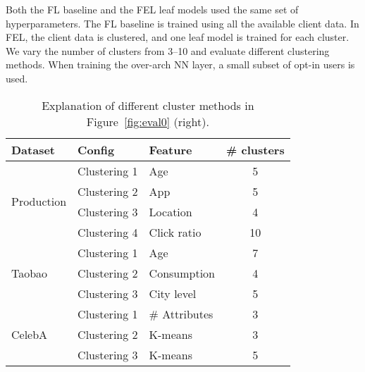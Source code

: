 Both the FL baseline and the FEL leaf models used the same set of hyperparameters. 
The FL baseline is trained using all the available client data. In FEL, the client data is clustered, and one leaf model is trained for each cluster. We vary the number of clusters from 3--10 and evaluate different clustering methods.
When training the over-arch NN layer, a small subset of opt-in users is used.


\begin{table}
\small
\centering
\caption{\label{tab:clusterconfig} Explanation of different cluster methods in Figure~\ref{fig:eval0} (right).}
\begin{tabular}{|l||l|l|c|}
\hline
Dataset & Config & Feature & \# clusters \\ \hline\hline
\multirow{4}{*}{Production} & Clustering 1 & Age & 5\\
 & Clustering 2 & App & 5\\
 & Clustering 3 & Location & 4\\
 & Clustering 4 & Click ratio & 10\\\hline
\multirow{3}{*}{Taobao~\cite{taobao}} & Clustering 1 & Age & 7\\
 & Clustering 2 & Consumption & 4\\
 & Clustering 3 & City level & 5\\\hline
\multirow{3}{*}{CelebA~\cite{liu2015deep}} & Clustering 1 & \# Attributes & 3\\
 & Clustering 2 & K-means & 3\\
 & Clustering 3 & K-means & 5\\\hline
\end{tabular}\\
\end{table}
